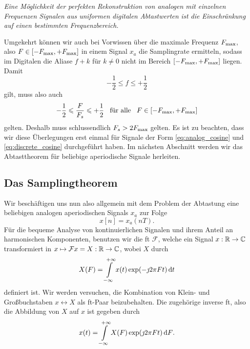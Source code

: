 \emph{Eine Möglichkeit der perfekten Rekonstruktion von analogen mit einzelnen Frequenzen Signalen aus uniformen digitalen Abtastwerten ist die Einschränkung auf einen bestimmten Frequenzbereich.}

Umgekehrt können wir auch bei Vorwissen über die maximale Frequenz $F_{\rm max}$, also $F \in [-F_{\rm max},+F_{\rm max}]$ in einem Signal $x_a$ die Samplingrate ermitteln, sodass im Digitalen die Aliase $f + k$ für $k \neq 0$ nicht im Bereich $[-F_{\rm max},+F_{\rm max}]$ liegen.
Damit
\[
    -\frac 12 \leqslant f \leqslant + \frac 12
\]
gilt, muss also auch
\[
    -\frac 12 \leqslant \frac{F}{F_s} \leqslant + \frac 12 {\hspace{3mm} \text{für alle} \hspace{3mm}} F \in [-F_{\rm max},+F_{\rm max}]
\]
gelten.
Deshalb muss schlussendlich $F_s > 2 F_{\rm max}$ gelten.
Es ist zu beachten, dass wir diese Überlegungen erst einmal  für Signale der Form \eqref{eq:analog_cosine} und \eqref{eq:discrete_cosine} durchgeführt haben.
Im nächsten Abschnitt werden wir das Abtasttheorem für beliebige aperiodische Signale herleiten.
%
%
\subsection{Das Samplingtheorem}\label{sec:sampling:sampling_theorem}
%
Wir beschäftigen uns nun also allgemein mit dem Problem der Abtastung eine beliebigen analogen aperiodischen Signals $x_a$ zur Folge
\[
    x[n] = x_a(nT).
\]
Für die bequeme Analyse von kontinuierlichen Signalen und ihrem Anteil an harmonischen Komponenten, benutzen wir die \gls{ft} $\mathcal{F}$, welche ein Signal $x : \mathbb{R} \rightarrow \mathbb{C}$ transformiert in $x \mapsto \mathcal{F} x = X : \mathbb{R} \rightarrow \mathbb{C}$, wobei $X$ durch
%
\begin{equation}\label{eq:sampling:fourier_trafo}
    X(F) = {\int\limits_{-\infty}^{+\infty}{x(t) \exp(-\jmath 2 \pi F t)}\,\mathrm{d}{t}}
\end{equation}
%
definiert ist.
Wir werden versuchen, die Kombination von Klein- und Großbuchstaben $x \leftrightarrow X$ als \gls{ft}-Paar beizubehalten.
Die zugehörige inverse \gls{ft}, also die Abbildung von $X$ auf $x$ ist gegeben durch
%
\begin{equation}\label{eq:inv_fourier_trafo}
    x(t) = {\int\limits_{-\infty}^{+\infty}{X(F) \exp(\jmath 2 \pi F t)}\,\mathrm{d}{F}}.
\end{equation}

